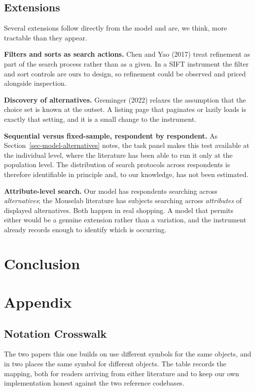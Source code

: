 \documentclass[
  letterpaper,
  DIV=11,
  numbers=noendperiod]{scrartcl}
\begin{document}
\subsection{Extensions}\label{sec-disc-extensions}

Several extensions follow directly from the model and are, we think,
more tractable than they appear.

\textbf{Filters and sorts as search actions.} Chen and Yao (2017) treat
refinement as part of the search process rather than as a given. In a
SIFT instrument the filter and sort controls are ours to design, so
refinement could be observed and priced alongside inspection.

\textbf{Discovery of alternatives.} Greminger (2022) relaxes the
assumption that the choice set is known at the outset. A listing page
that paginates or lazily loads is exactly that setting, and it is a
small change to the instrument.

\textbf{Sequential versus fixed-sample, respondent by respondent.} As
Section~\ref{sec-model-alternatives} notes, the task panel makes this
test available at the individual level, where the literature has been
able to run it only at the population level. The distribution of search
protocols across respondents is therefore identifiable in principle and,
to our knowledge, has not been estimated.

\textbf{Attribute-level search.} Our model has respondents searching
across \emph{alternatives}; the Mouselab literature has subjects
searching across \emph{attributes} of displayed alternatives. Both
happen in real shopping. A model that permits either would be a genuine
extension rather than a variation, and the instrument already records
enough to identify which is occurring.

\section{Conclusion}\label{sec-conclusion}

\section{Appendix}\label{sec-appendix}

\subsection{Notation Crosswalk}\label{sec-appendix-notation}

The two papers this one builds on use different symbols for the same
objects, and in two places the same symbol for different objects. The
table records the mapping, both for readers arriving from either
literature and to keep our own implementation honest against the two
reference codebases.
\end{document}
